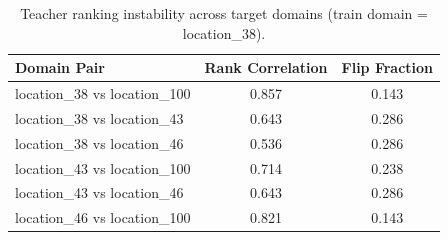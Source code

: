 \begin{table}[t]
    \centering
    \caption{Teacher ranking instability across target domains (train domain = location_38).}
    \label{tab:instability_location_38_accuracy}
    \begin{tabular}{lcc}
        \toprule
        Domain Pair & Rank Correlation & Flip Fraction \\
        \midrule
        location_38 vs location_100 & 0.857 & 0.143 \\
        location_38 vs location_43 & 0.643 & 0.286 \\
        location_38 vs location_46 & 0.536 & 0.286 \\
        location_43 vs location_100 & 0.714 & 0.238 \\
        location_43 vs location_46 & 0.643 & 0.286 \\
        location_46 vs location_100 & 0.821 & 0.143 \\
        \bottomrule
    \end{tabular}
\end{table}

